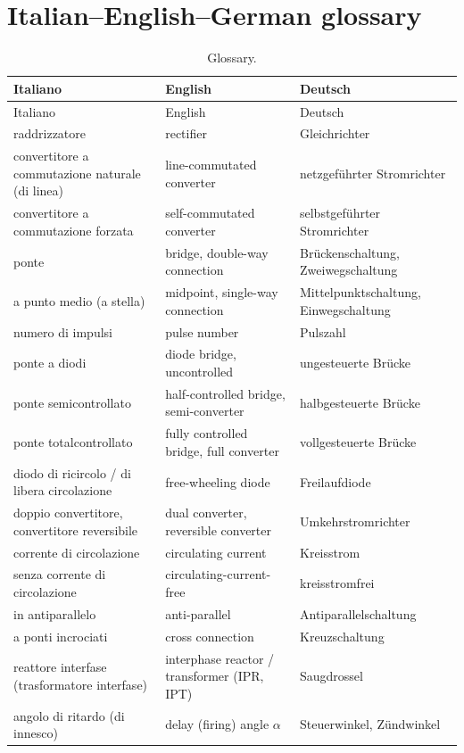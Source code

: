 \documentclass[11pt,a4paper]{article}
\begin{document}
\section{Italian--English--German glossary}

\begin{longtable}{p{4.6cm}p{4.8cm}p{5cm}}
\caption{Glossary.}\\
\toprule
Italiano & English & Deutsch \\
\midrule
\endfirsthead
\toprule
Italiano & English & Deutsch \\
\midrule
\endhead
raddrizzatore & rectifier & Gleichrichter \\
convertitore a commutazione naturale (di linea) & line-commutated converter & netzgeführter Stromrichter \\
convertitore a commutazione forzata & self-commutated converter & selbstgeführter Stromrichter \\
ponte & bridge, double-way connection & Brückenschaltung, Zweiwegschaltung \\
a punto medio (a stella) & midpoint, single-way connection & Mittelpunktschaltung, Einwegschaltung \\
numero di impulsi & pulse number & Pulszahl \\
ponte a diodi & diode bridge, uncontrolled & ungesteuerte Brücke \\
ponte semicontrollato & half-controlled bridge, semi-converter & halbgesteuerte Brücke \\
ponte totalcontrollato & fully controlled bridge, full converter & vollgesteuerte Brücke \\
diodo di ricircolo / di libera circolazione & free-wheeling diode & Freilaufdiode \\
doppio convertitore, convertitore reversibile & dual converter, reversible converter & Umkehrstromrichter \\
corrente di circolazione & circulating current & Kreisstrom \\
senza corrente di circolazione & circulating-current-free & kreisstromfrei \\
in antiparallelo & anti-parallel & Antiparallelschaltung \\
a ponti incrociati & cross connection & Kreuzschaltung \\
reattore interfase (trasformatore interfase) & interphase reactor / transformer (IPR, IPT) & Saugdrossel \\
angolo di ritardo (di innesco) & delay (firing) angle $\alpha$ & Steuerwinkel, Zündwinkel \\

\end{longtable}
\end{document}
